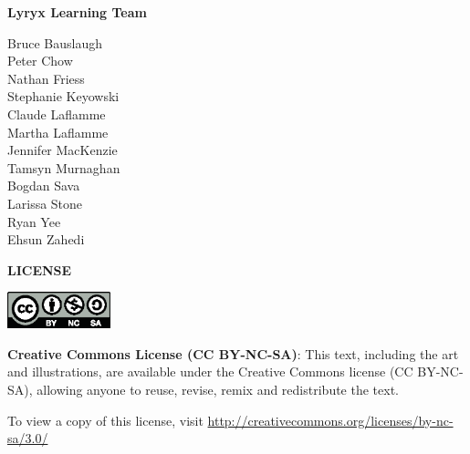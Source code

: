 {\small
\begin{center}
\textbf{Lyryx Learning Team}
\vspace{-1em}

\begin{multicols}{2}
Bruce Bauslaugh \\
Peter Chow \\
Nathan Friess \\
Stephanie Keyowski \\
Claude Laflamme \\
Martha Laflamme \\ 
Jennifer MacKenzie \\
Tamsyn Murnaghan \\
Bogdan Sava \\
Larissa Stone \\
Ryan Yee\\
Ehsun Zahedi\\
\end{multicols}
\end{center}

}

\vfill

\begin{center}
\fontsize{14pt}{16pt}\selectfont\textcolor{titlepagecolour}{\textbf{LICENSE}}
\end{center}



\begin{center}

 \includegraphics[width=3cm]{images/by-nc-sa.eps}

\medskip


\textbf{Creative Commons License (CC BY-NC-SA)}: This text, including the art and illustrations, are available under the Creative Commons license (CC BY-NC-SA), allowing anyone to reuse, revise, remix and redistribute the text.  

\medskip

 To view a copy of this license,
visit \href{http://creativecommons.org/licenses/by-nc-sa/3.0/}{http://creativecommons.org/licenses/by-nc-sa/3.0/}  

\end{center}


\setlength{\parskip}{\baselineskip}
